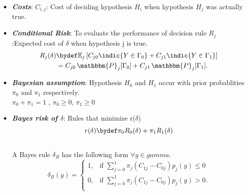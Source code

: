 \documentclass[12pt]{report}
\begin{document}
\begin{itemize}
\item {\bf \em Costs}: $C_{i,j}$: Cost of deciding hypothesis $H_i$ when hypothesis $H_j$ was actually true.
\item {\bf \em Conditional Risk}: To evaluate the performance of decision rule 
 $R_j$:Expected cost of $\delta$ when hypothesis j is true.
\begin{align*}
R_j(\delta) &\bydef \mathbb{E}_j\left[ C_{j0}\indic{Y \in \Gamma_0} + C_{j1}\indic{Y \in \Gamma_1} \right] \\
&= C_{j0} \, \mathbbm{P}_j[\Gamma_0] + C_{j1} \, \mathbbm{P}_j[\Gamma_1].
\end{align*}
\item {\bf \em Bayesian assumption}: Hypothesis  $H_0$ and $H_1$ occur with prior probablities $\pi_0$ and $\pi_1$ respectively.\\
$\pi_0 + \pi_1 = 1$ , $\pi_0 \ge 0$, $\pi_1 \ge 0$
\item {\bf \em Bayes risk of $\delta$}: Rules that minimize r($\delta$)
\begin{align}
r(\delta) &\bydef \pi_0 R_0(\delta) + \pi_1 R_1(\delta) \\
\nonumber
\end{align}
A Bayes rule $\delta_B$ has the following form $\forall y \in gamma$.\\
\[ \delta_B(y) = \left\{ 
\begin{array}{cc}
1, &  \text{if }\sum_{j=0}^1 \pi_j \left( C_{1j} - C_{0j} \right) p_j (y) \leq 0 \\
0, &  \text{if }\sum_{j=0}^1 \pi_j \left( C_{1j} - C_{0j} \right) p_j (y) > 0. \\
\end{array}
 \right. \]

\end{itemize}
\end{document}
